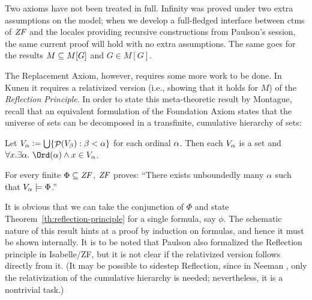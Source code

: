 

Two axioms have not been treated in full. Infinity was proved under
two extra assumptions on the model; when we develop a full-fledged
interface between ctms of $\mathit{ZF}$  and the locales 
providing recursive constructions from Paulson's
 session, the same current proof will hold
with no extra assumptions. The same goes for the results $M\subseteq M[G]$
and $G\in M[G]$. 

The Replacement Axiom, however, requires some more work to be
done. In Kunen it
requires a relativized version (i.e., showing that it holds for $M$)
of the \emph{Reflection Principle}. In order to state this
meta-theoretic result by Montague, recall that an equivalent
formulation of the Foundation Axiom states that the universe of sets
can be decomposed in a transfinite, cumulative hierarchy of sets:
\begin{theorem}
  Let $V_{\alpha}\mathrel{\mathop:}=\mathop{\textstyle\bigcup}\{\mathop{\mathcal{P}}(V_\beta) : \beta<\alpha\}$ for each ordinal
  $\alpha$. Then each $V_\alpha$ is a set and 
  $\forall x. \exists\al .\ \Ord(\al) \y x\in V_\al$.  
\end{theorem}
\begin{theorem}\label{th:reflection-principle}
  For every finite $\Phi\subseteq\mathit{ZF}$, $\mathit{ZF}$ proves: ``There exists
  unboundedly many $\alpha$ such that $V_\alpha\models \Phi$.''
\end{theorem}

It is obvious that we can take the conjunction of $\Phi$ and state
Theorem~\ref{th:reflection-principle} for a single formula, say $\phi$.
The schematic nature of this result
hints at a proof by induction on formulas, and hence it must be shown
internally. It is to be noted that Paulson
\cite{DBLP:conf/cade/Paulson02} also formalized the
Reflection principle in Isabelle/ZF, but it is not clear if the
relativized version follows directly from it. (It may be possible to
sidestep Reflection, since in Neeman \cite{neeman-course}, only the
relativization of the cumulative hierarchy is needed; nevertheless, it
is a nontrivial task.)

